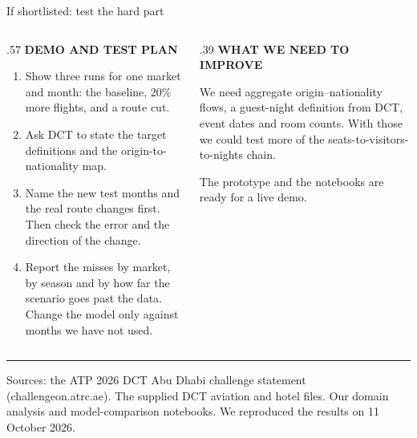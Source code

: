 \documentclass[aspectratio=169,10pt]{beamer}
\newcommand{\kicker}[1]{{\color{Accent}\scriptsize\bfseries\MakeUppercase{#1}}\par\vspace{.16cm}}
\newcommand{\smallnote}[1]{{\color{Muted}\scriptsize #1}}
\begin{document}
\begin{frame}{If shortlisted: test the hard part}
  \begin{columns}[T,totalwidth=\linewidth]
    \begin{column}{.57\linewidth}
      \kicker{Demo and test plan}
      \begin{enumerate}\setlength\itemsep{.12cm}
        \item Show three runs for one market and month: the baseline, 20\% more flights, and a route cut.
        \item Ask DCT to state the target definitions and the origin-to-nationality map.
        \item Name the new test months and the real route changes first. Then check the error and the direction of the change.
        \item Report the misses by market, by season and by how far the scenario goes past the data. Change the model only against months we have not used.
      \end{enumerate}
    \end{column}
    \begin{column}{.39\linewidth}
      \kicker{What we need to improve}
      We need aggregate origin--nationality flows, a guest-night definition from DCT, event dates and room counts. With those we could test more of the seats-to-visitors-to-nights chain.

      \vspace{.40cm}
      \smallnote{The prototype and the notebooks are ready for a live demo.}
    \end{column}
  \end{columns}
  \vfill
  {\color{Rule}\rule{\linewidth}{.5pt}}\par
  \tiny Sources: the ATP 2026 DCT Abu Dhabi challenge statement (challengeon.atrc.ae). The supplied DCT aviation and hotel files. Our domain analysis and model-comparison notebooks. We reproduced the results on 11 October 2026.
\end{frame}
\end{document}
